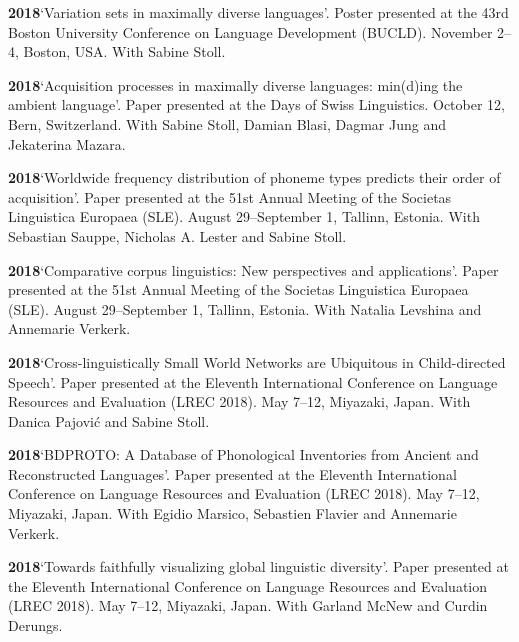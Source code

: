 \documentclass[11pt]{article}
\newcommand{\hangpara}{
 \setlength{\parindent}{0in} %
 \hangindent=0.42in %
}
\begin{document}
\hangpara
\vskip 6pt
{\bf 2018}\hspace{1ex}`Variation sets in maximally diverse languages'. Poster presented at the 43rd Boston University Conference on Language Development (BUCLD). November 2--4, Boston, USA. With Sabine Stoll.

\hangpara
\vskip 6pt
{\bf 2018}\hspace{1ex}`Acquisition processes in maximally diverse languages: min(d)ing the ambient language'. Paper presented at the Days of Swiss Linguistics. October 12, Bern, Switzerland. With Sabine Stoll, Damian Blasi, Dagmar Jung and Jekaterina Mazara.

\vskip 6pt
\hangpara
{\bf 2018}\hspace{1ex}`Worldwide frequency distribution of phoneme types predicts their order of acquisition'. Paper presented at the 51st Annual Meeting of the Societas Linguistica Europaea (SLE). August 29--September 1, Tallinn, Estonia. With Sebastian Sauppe, Nicholas A. Lester and Sabine Stoll.

\vskip 6pt
\hangpara
{\bf 2018}\hspace{1ex}`Comparative corpus linguistics: New perspectives and applications'. Paper presented at the 51st Annual Meeting of the Societas Linguistica Europaea (SLE). August 29--September 1, Tallinn, Estonia. With Natalia Levshina and Annemarie Verkerk.

\vskip 6pt
\hangpara
{\bf 2018}\hspace{1ex}`Cross-linguistically Small World Networks are Ubiquitous in Child-directed Speech'. Paper presented at the Eleventh International Conference on Language Resources and Evaluation (LREC 2018). May 7--12, Miyazaki, Japan. With Danica Pajovi{\'c} and Sabine Stoll.

\vskip 6pt
\hangpara
{\bf 2018}\hspace{1ex}`BDPROTO: A Database of Phonological Inventories from Ancient and Reconstructed Languages'. Paper presented at the Eleventh International Conference on Language Resources and Evaluation (LREC 2018). May 7--12, Miyazaki, Japan. With Egidio Marsico, Sebastien Flavier and Annemarie Verkerk.

\vskip 6pt
\hangpara
{\bf 2018}\hspace{1ex}`Towards faithfully visualizing global linguistic diversity'. Paper presented at the Eleventh International Conference on Language Resources and Evaluation (LREC 2018). May 7--12, Miyazaki, Japan. With Garland McNew and Curdin Derungs.
\end{document}
